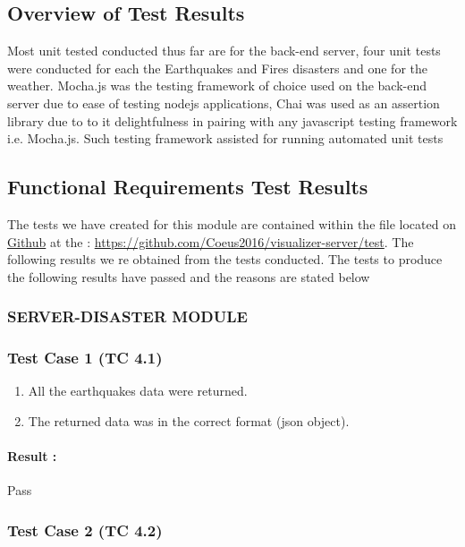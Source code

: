 \subsection{Overview of Test Results}

Most unit tested conducted thus far are for the back-end server, four unit tests were conducted for each the Earthquakes and Fires disasters and one for the weather. Mocha.js was the testing framework of choice used on the back-end server due to ease of testing nodejs applications, Chai was used as an assertion library due to to it delightfulness in pairing with any javascript testing framework i.e. Mocha.js. Such testing framework assisted for running automated unit tests

\subsection{Functional Requirements Test Results}

The tests we have created for this module are contained within the file
located on \href{https://github.com}{Github} at the : \url{https://github.com/Coeus2016/visualizer-server/test}. The following results we re obtained from the tests conducted. The tests to produce the following results have passed and the reasons are stated below \\

\subsubsection*{SERVER-DISASTER MODULE}

\subsubsection{Test Case 1 (TC 4.1)}

\begin{enumerate}
	\item All the earthquakes data were returned.
	\item The returned data was in the correct format (json object).
\end{enumerate}

\paragraph{Result :} Pass

\subsubsection{Test Case 2 (TC 4.2)}

